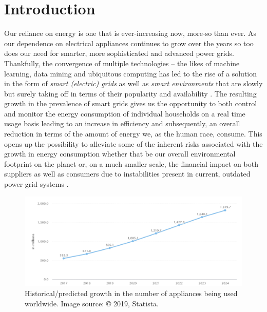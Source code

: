 \chapter{Introduction}
\label{ch:Introduction}
Our reliance on energy is one that is ever-increasing now, more-so than ever. As our dependence on electrical appliances continues to grow over the years \cite{Statista, WBCSD, Yixuan} so too does our need for smarter, more sophisticated and advanced power grids. Thankfully, the convergence of multiple technologies -- the likes of machine learning, data mining and ubiquitous computing has led to the rise of a solution in the form of \textit{smart (electric) grids} as well as \textit{smart environments} that are slowly but surely taking off in terms of their popularity and availability \cite{Chao}. The resulting growth in the prevalence of smart grids gives us the opportunity to both control and monitor the energy consumption of individual households on a real time usage basis \cite{Yildiz} leading to an increase in efficiency and subsequently, an overall reduction in terms of the amount of energy we, as the human race, consume. This opens up the possibility to alleviate some of the inherent risks associated with the growth in energy consumption whether that be our overall environmental footprint on the planet or, on a much smaller scale, the financial impact on both suppliers as well as consumers due to instabilities present in current, outdated power grid systems \cite{Hsiao}.

\begin{figure}[hbt!]
    \centering
    \includegraphics[width=\textwidth]{Images/Chapter 1/Statista/Appliance-Usage-Growth.pdf}
    \caption{Historical/predicted growth in the number of appliances being used worldwide. Image source: \cite{Statista} © 2019, Statista.}
    \label{fig:Appliance-Usage-Growth}
\end{figure}

